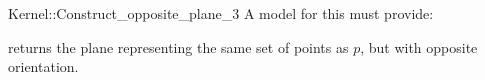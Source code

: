\begin{ccRefFunctionObjectConcept}{Kernel::Construct_opposite_plane_3}
A model for this must provide:


{returns the plane representing the same set of points as $p$,
but with opposite orientation.}

\end{ccRefFunctionObjectConcept}
